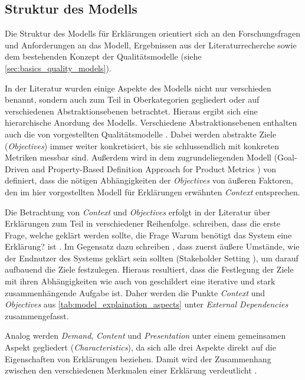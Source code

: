 \subsection{Struktur des Modells}

Die Struktur des Modells für Erklärungen orientiert sich an den Forschungsfragen und Anforderungen an das Modell, Ergebnissen aus der Literaturrecherche sowie dem bestehenden Konzept der Qualitätsmodelle \cite{schneider2012abenteuer} (siehe \autoref{sec:basics_quality_models}).

In der Literatur wurden einige Aspekte des Modells nicht nur verschieden benannt, sondern auch zum Teil in Oberkategorien gegliedert oder auf verschiedenen Abstraktionsebenen betrachtet. Hieraus ergibt sich eine hierarchische Anordung des Modells. Verschiedene Abstraktionsebenen enthalten auch die von \citeauthor{schneider2012abenteuer} vorgestellten Qualitätsmodelle \cite{schneider2012abenteuer}. Dabei werden abstrakte Ziele (\textit{Objectives}) immer weiter konkretisiert, bis sie schlussendlich mit konkreten Metriken messbar sind. Außerdem wird in dem zugrundeliegenden Modell (\glqq Goal-Driven and Property-Based Definition Approach for Product Metrics\grqq{} \cite{briand1995goal}) von \citeauthor{briand1995goal} definiert, dass die nötigen Abhängigkeiten der \textit{Objectives} von äußeren Faktoren, den im hier vorgestellten Modell für Erklärungen erwähnten \textit{Context} entsprechen.

Die Betrachtung von \textit{Context} und \textit{Objectives} erfolgt in der Literatur über Erklärungen zum Teil in verschiedener Reihenfolge. \citeauthor{rosenfeld_explainability_2019} schreiben, dass die erste Frage, welche geklärt werden sollte, die Frage \glqq Warum benötigt das System eine Erklärung?\grqq{} ist \cite[vgl. S. 699][]{rosenfeld_explainability_2019}\cite{nunes_systematic_2017}. Im Gegensatz dazu schreiben \citeauthor{cirqueira_scenario-based_2020}, dass zuerst äußere Umstände, wie der Endnutzer des Systems geklärt sein sollten (\glqq Stakeholder Setting\grqq{} \cite{cirqueira_scenario-based_2020}), um darauf aufbauend die Ziele festzulegen. Hieraus resultiert, dass die Festlegung der Ziele mit ihren Abhängigkeiten wie auch von \cite{schneider2012abenteuer} geschildert eine iterative und stark zusammenhängende Aufgabe ist. Daher werden die Punkte \textit{Context} und \textit{Objectives} aus \autoref{tab:model_explaination_aspects} unter \textit{External Dependencies} zusammengefasst.

Analog werden \textit{Demand}, \textit{Content} und \textit{Presentation} unter einem gemeinsamen Aspekt gegliedert (\textit{Characteristics}), da sich alle drei Aspekte direkt auf die Eigenschaften von Erklärungen beziehen. Damit wird der Zusammenhang zwischen den verschiedenen Merkmalen einer Erklärung verdeutlicht \cite{nunes_systematic_2017}.


